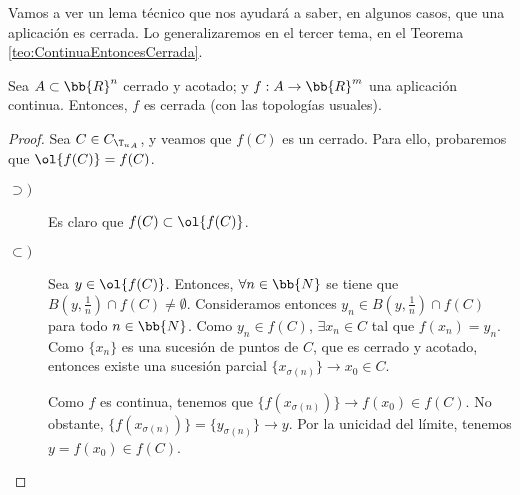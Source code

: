 Vamos a ver un lema técnico que nos ayudará a saber, en algunos casos, que una aplicación es cerrada. Lo generalizaremos en el tercer tema, en el Teorema \ref{teo:ContinuaEntoncesCerrada}.
\begin{lema}
    Sea $A\subset \bb{R}^n$ cerrado y acotado; y $f:A\to \bb{R}^m$ una aplicación continua. Entonces, $f$ es cerrada (con las topologías usuales).
\end{lema}
\begin{proof}
    Sea $C\in C_{{\T_u}_A}$, y veamos que $f(C)$ es un cerrado. Para ello, probaremos que $\ol{f(C)}=f(C)$.
    \begin{description}
        \item[$\supset)$] Es claro que $f(C)\subset\ol{f(C)}$.

        \item[$\subset)$] Sea $y\in \ol{f(C)}$. Entonces, $\forall n\in \bb{N}$ se tiene que $B\left(y,\frac{1}{n}\right)\cap f(C)\neq \emptyset$. Consideramos entonces $y_n\in B\left(y,\frac{1}{n}\right)\cap f(C)$ para todo $n\in \bb{N}$. Como $y_n\in f(C)$, $\exists x_n\in C$ tal que $f(x_n)=y_n$. Como $\{x_n\}$ es una sucesión de puntos de $C$, que es cerrado y acotado, entonces existe una sucesión parcial $\{x_{\sigma(n)}\}\to x_0\in C$.

        Como $f$ es continua, tenemos que $\{f(x_{\sigma(n)})\}\to f(x_0)\in f(C)$. No obstante, $\{f(x_{\sigma(n)})\}=\{y_{\sigma(n)}\}\to y$. Por la unicidad del límite, tenemos $y=f(x_0)\in f(C)$.
    \end{description}
\end{proof}

